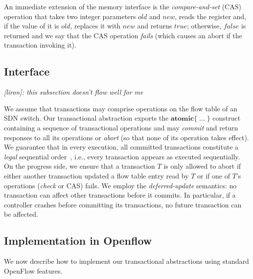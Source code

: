 \documentclass[conference]{sigcomm-alternate}
\newcommand{\liron}[1]{\textit{\textcolor{mygreen}{[liron]: #1}}} %
\begin{document}
An immediate extension of the memory interface is the \emph{compare-and-set} (CAS) operation that takes two integer parameters
$\textit{old}$ and $\textit{new}$, reads the register and, if the
value of it is $\textit{old}$, replaces it with $\textit{new}$ and
returns $\textit{true}$; otherwise, $\textit{false}$ is returned and
we say that the CAS operation \emph{fails} (which causes an abort if
the transaction invoking it).   

\subsection{Interface}\label{sec:t-if}

\liron{this subsection doesn't flow well for me}

We assume that transactions may comprise operations on the flow table
of an SDN switch. Our transactional abstraction exports the
$\textbf{atomic}\{\;\ldots\;\}$ construct
containing a sequence of transactional
operations and may \emph{commit} and return responses to all its operations
or \emph{abort} (so that none of its operation takes effect).  
We guarantee that in every execution, all committed
transactions constitute a \emph{legal} sequential
order~\cite{Pap79-serial}, i.e., every transaction appears as executed
sequentially. On the progress side, we ensure that a
transaction $T$ is only allowed to abort if either another 
transaction updated a flow table entry read by $T$  
or if one of $T$'s operations (\textit{check} or CAS) fails.
We employ the \emph{deferred-update} semantics:  
no transaction can affect other transactions before it commits.
In particular, if a controller crashes before committing its
transactions, no future transaction can be affected.  


\subsection{Implementation in Openflow}\label{sec:t-impl}

We now describe how to implement our transactional 
abstractions using standard OpenFlow features. 
\end{document}
